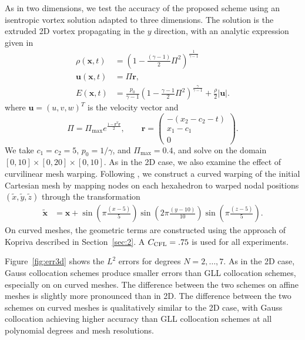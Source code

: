 \documentclass[onefignum,onetabnum,final]{siamart171218}
\renewcommand{\tilde}{\widetilde}
\newcommand{\LRp}[1]{\left( #1 \right)}
\newcommand{\LRb}[1]{\left| #1 \right|}
\begin{document}
As in two dimensions, we test the accuracy of the proposed scheme using an isentropic vortex solution adapted to three dimensions.  The solution is the extruded 2D vortex propagating in the $y$ direction, with an analytic expression given in \cite{williams2013nodal}
\begin{align*}
\rho(\bm{x},t) &= \LRp{1-\frac{(\gamma-1)}{2}\Pi^2}^{\frac{1}{\gamma-1}}\\
\bm{u}(\bm{x},t) &= \Pi \bm{r}, \\
E(\bm{x},t) &= \frac{p_0}{\gamma-1}\LRp{1-\frac{\gamma-1}{2}\Pi^2}^{\frac{\gamma}{\gamma-1}} + \frac{\rho}{2}\LRb{\bm{u}}.
\end{align*}
where $\bm{u} = (u,v,w)^T$ is the velocity vector and %
\[
\Pi = \Pi_{\max}e^{\frac{1-\bm{r}^T\bm{r}}{2}}, \qquad \bm{r} = \begin{pmatrix}
-(x_2-c_2-t)\\
x_1-c_1\\
0
\end{pmatrix}.
\]
We take $c_1 = c_2 = 5$, $p_0 = {1}/{\gamma}$, and $\Pi_{\max} = 0.4$, and solve on the domain $[0,10]\times [0,20]\times [0,10]$.  As in the 2D case, we also examine the effect of curvilinear mesh warping.  Following \cite{chan2018discretely}, we construct a curved warping of the initial Cartesian mesh by mapping nodes on each hexahedron to warped nodal positions $(\tilde{x},\tilde{y},\tilde{z})$ through the transformation
\begin{align*}
\tilde{\bm{x}} &= \bm{x} + \sin\LRp{\pi \frac{(x-5)}{5}}\sin\LRp{2\pi \frac{(y-10)}{10}}\sin\LRp{\pi \frac{(z-5)}{5}}.
\end{align*} 
On curved meshes, the geometric terms are constructed using the approach of Kopriva described in Section~\ref{sec:2}.  A $C_{\rm CFL} = .75$ is used for all experiments.  

Figure~\ref{fig:err3d} shows the $L^2$ errors for degrees $N = 2,\ldots, 7$.  As in the 2D case, Gauss collocation schemes produce smaller errors than GLL collocation schemes, especially on on curved meshes.  The difference between the two schemes on affine meshes is slightly more pronounced than in 2D.  The difference between the two schemes on curved meshes is qualitatively similar to the 2D case, with Gauss collocation achieving higher accuracy than GLL collocation schemes at all polynomial degrees and mesh resolutions.  %
\end{document}
